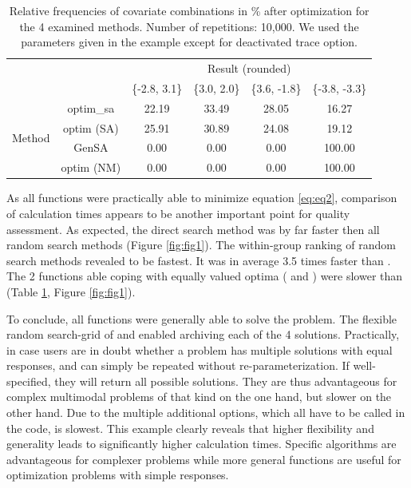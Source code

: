 \begin{table}[]
	\centering
	\caption{Relative frequencies of covariate combinations in \% after optimization for the 4 examined methods. Number of repetitions: 10,000. We used the parameters given in the example except for deactivated trace option.}
	\label{tab:tab1}
	\begin{tabular}{cccccc} \cline{3-6}
& \multicolumn{1}{c}{} & \multicolumn{4}{c}{Result (rounded)}                    \\ \cline{3-6} 
		&                      & \{-2.8, 3.1\} & \{3.0, 2.0\} & \{3.6, -1.8\} & \{-3.8, -3.3\} \\ \cline{2-6} 
		\multirow{4}{*}{Method} & optim\_sa          & 22.19     & 33.49    & 28.05     & 16.27      \\
		& optim (SA)            & 25.91     & 30.89    & 24.08     & 19.12      \\
		& GenSA              & 0.00      & 0.00     & 0.00      & 100.00     \\
		& optim (NM)          & 0.00      & 0.00     & 0.00      & 100.00     \\ \cline{2-6} 
	\end{tabular}
\end{table}

As all functions were practically able to minimize equation \ref{eq:eq2}, comparison of calculation times appears to be another important point for quality assessment. As expected, the direct search method  was by far faster then all random search methods (Figure \ref{fig:fig1}). The within-group ranking of random search methods revealed  to be fastest. It was in average 3.5 times faster than . The 2 functions able coping with equally valued optima ( and ) were slower than  (Table \ref{tab:tab1}, Figure \ref{fig:fig1}).

To conclude, all functions were generally able to solve the problem. The flexible random search-grid of  and  enabled archiving each of the 4 solutions. Practically, in case users are in doubt whether a problem has multiple solutions with equal responses,  and  can simply be repeated without re-parameterization. If well-specified, they will return all possible solutions. They are thus advantageous for complex multimodal problems of that kind on the one hand, but slower on the other hand. Due to the multiple additional options, which all have to be called in the code,  is slowest. This example clearly reveals that higher flexibility and generality leads to significantly higher calculation times. Specific algorithms are advantageous for complexer problems while more general functions are useful for optimization problems with simple responses.

